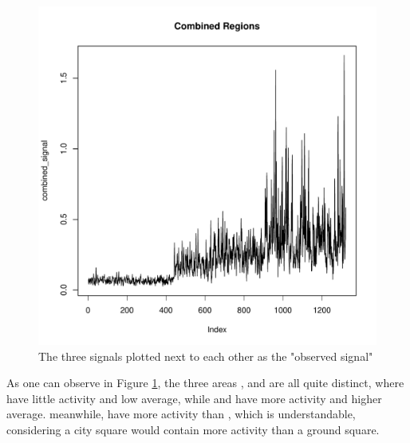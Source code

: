 \documentclass[12pt,a4paper,twoside]{article}
\begin{document}
\begin{figure}[!ht]
	\centering
    \includegraphics[width = \textwidth]{img/combined_regions.pdf}
	\caption{The three signals plotted next to each other as the "observed signal" }
	\label{fig:observededsignalfig}
\end{figure}

\noindent As one can observe in Figure \ref{fig:observededsignalfig}, the three areas , 
and  are all quite distinct, where  have little activity and low average, while
 and  have more activity and higher average. meanwhile,  have more activity than
, which is understandable, considering a city square would contain more activity than a ground square.
\end{document}
